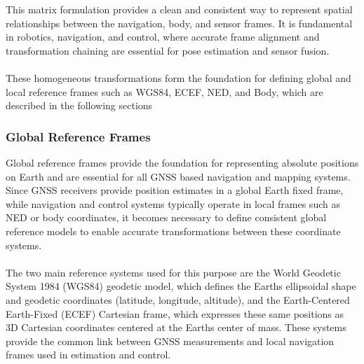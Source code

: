 This matrix formulation provides a clean and consistent way to represent spatial relationships between the navigation, body, and sensor frames. It is fundamental in robotics, navigation, and control, where accurate frame alignment and transformation chaining are essential for pose estimation and sensor fusion.
\\ \\
These homogeneous transformations form the foundation for defining global and local reference frames such as WGS84, ECEF, NED, and Body, which are described in the following sections



\subsubsection{Global Reference Frames}
Global reference frames provide the foundation for representing absolute positions on Earth and are essential for all GNSS based navigation and mapping systems. Since GNSS receivers provide position estimates in a global Earth fixed frame, while navigation and control systems typically operate in local frames such as NED or body coordinates, it becomes necessary to define consistent global reference models to enable accurate transformations between these coordinate systems.   
\\ \\
The two main reference systems used for this purpose are the World Geodetic System 1984 (WGS84) geodetic model, which defines the Earths ellipsoidal shape and geodetic coordinates (latitude, longitude, altitude), and the Earth-Centered Earth-Fixed (ECEF) Cartesian frame, which expresses these same positions as 3D Cartesian coordinates centered at the Earths center of mass. These systems provide the common link between GNSS measurements and local navigation frames used in estimation and control.

\newpage

